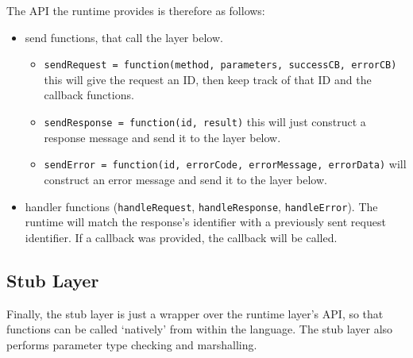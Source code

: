 The API the runtime provides is therefore as follows:
\begin{itemize}
	\item send functions, that call the layer below.
	\begin{itemize}
		\item \lstinline+sendRequest = function(method, parameters, successCB, errorCB)+ this will give the request an ID, then keep track of that ID and the callback functions.
		\item \lstinline+sendResponse = function(id, result)+ this will just construct a response message and send it to the layer below.
		\item \lstinline+sendError = function(id, errorCode, errorMessage, errorData)+ will construct an error message and send it to the layer below.
	\end{itemize}
	\item handler functions (\lstinline+handleRequest+, \lstinline+handleResponse+, \lstinline+handleError+). The runtime will match the response's identifier with a previously sent request identifier. If a callback was provided, the callback will be called.
\end{itemize}

\subsection{Stub Layer} %
\label{sub:stub_layer_design}
Finally, the stub layer is just a wrapper over the runtime layer's API, so that functions can be called `natively' from within the language. The stub layer also performs parameter type checking and marshalling.

